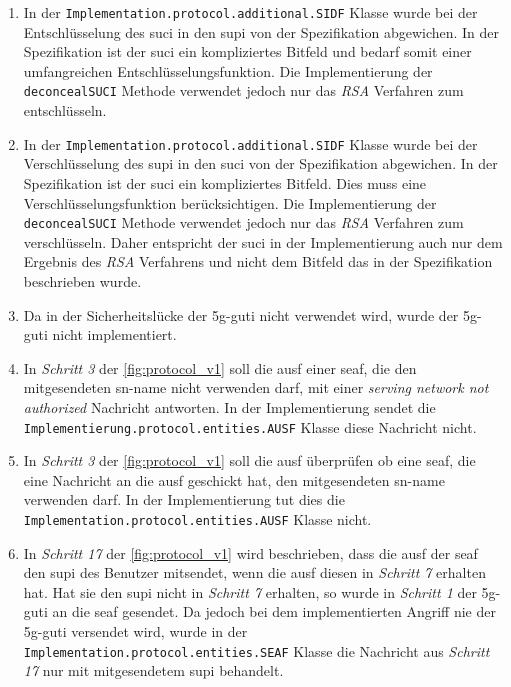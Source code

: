 \begin{enumerate}
\item In der \lstinline{Implementation.protocol.additional.SIDF} Klasse wurde bei der Entschlüsselung des \gls{suci} in den \gls{supi} von der Spezifikation abgewichen.
In der Spezifikation ist der \gls{suci} ein kompliziertes Bitfeld und bedarf somit einer umfangreichen Entschlüsselungsfunktion.
Die Implementierung der \lstinline{deconcealSUCI} Methode verwendet jedoch nur das \textit{RSA} Verfahren zum entschlüsseln.

\item In der \lstinline{Implementation.protocol.additional.SIDF} Klasse wurde bei der Verschlüsselung des \gls{supi} in den \gls{suci} von der Spezifikation abgewichen.
In der Spezifikation ist der \gls{suci} ein kompliziertes Bitfeld. Dies muss eine Verschlüsselungsfunktion berücksichtigen.
Die Implementierung der \lstinline{deconcealSUCI} Methode verwendet jedoch nur das \textit{RSA} Verfahren zum verschlüsseln.
Daher entspricht der \gls{suci} in der Implementierung auch nur dem Ergebnis des \textit{RSA} Verfahrens und nicht dem Bitfeld das in der Spezifikation beschrieben wurde.

\item Da in der Sicherheitslücke der \gls{5g-guti} nicht verwendet wird, wurde der \gls{5g-guti} nicht implementiert.

\item In \textit{Schritt 3} der \cref{fig:protocol_v1} soll die \gls{ausf} einer \gls{seaf}, die den mitgesendeten \gls{sn-name} nicht verwenden darf, mit einer \textit{serving network not authorized} Nachricht antworten.
In der Implementierung sendet die \lstinline{Implementierung.protocol.entities.AUSF} Klasse diese Nachricht nicht.

\item In \textit{Schritt 3} der \cref{fig:protocol_v1} soll die \gls{ausf} überprüfen ob eine \gls{seaf}, die eine Nachricht an die \gls{ausf} geschickt hat, den mitgesendeten \gls{sn-name} verwenden darf.
In der Implementierung tut dies die \lstinline{Implementation.protocol.entities.AUSF} Klasse nicht.

\item In \textit{Schritt 17} der \cref{fig:protocol_v1} wird beschrieben, dass die \gls{ausf} der \gls{seaf} den \gls{supi} des Benutzer mitsendet, wenn die \gls{ausf} diesen in \textit{Schritt 7} erhalten hat.
Hat sie den \gls{supi} nicht in \textit{Schritt 7} erhalten, so wurde in \textit{Schritt 1} der \gls{5g-guti} an die \gls{seaf} gesendet.
Da jedoch bei dem implementierten Angriff nie der \gls{5g-guti} versendet wird, wurde in der \lstinline{Implementation.protocol.entities.SEAF} Klasse die Nachricht aus \textit{Schritt 17} nur mit mitgesendetem \gls{supi} behandelt.


\end{enumerate}
